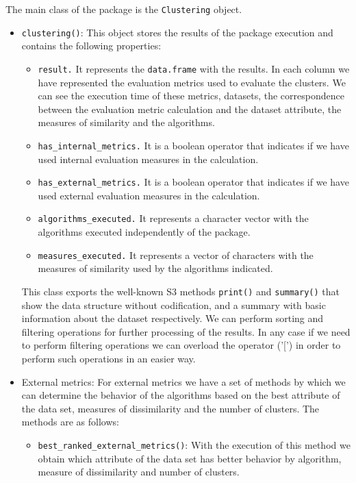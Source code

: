 The main class of the package is the \texttt{Clustering} object.
\begin{itemize}
    \item \texttt{clustering()}: This object stores the results of the  package execution and contains the following properties:
    \begin{itemize}
        \item \texttt{result.} It represents the \texttt{data.frame} with the results. In each column we have represented the evaluation metrics used to evaluate the clusters. We can see the execution time of these metrics, datasets, the correspondence between the evaluation metric calculation and the dataset attribute, the measures of similarity and the algorithms.
        \item \texttt{has\_internal\_metrics.} It is a boolean operator that indicates if we have used internal evaluation measures in the calculation.
        \item \texttt{has\_external\_metrics.} It is a boolean operator that indicates if we have used external evaluation measures in the calculation.
        \item \texttt{algorithms\_executed.} It represents a character vector with the algorithms executed independently of the package.
        \item \texttt{measures\_executed.} It represents a vector of characters with the measures of similarity used by the algorithms indicated.
    \end{itemize}
This class exports the well-known S3 methods \texttt{print()} and \texttt{summary()} that show the data structure without codification, and a summary with basic information about the dataset respectively. We can perform sorting and filtering operations for further processing of the results. In any case if we need to perform filtering operations we can overload the operator ('[') in order to perform such operations in an easier way.
    \item External metrics: For external metrics we have a set of methods by which we can determine the behavior of the algorithms based on the best attribute of the data set, measures of dissimilarity and the number of clusters. The methods are as follows:
    \begin{itemize}
      \item \texttt{best\_ranked\_external\_metrics()}: With the execution of this method we obtain which attribute of the data set has better behavior by algorithm, measure of dissimilarity and number of clusters.

\end{itemize}
\end{itemize}
